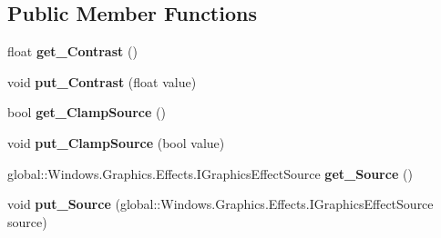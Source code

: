 \subsection*{Public Member Functions}
\begin{DoxyCompactItemize}
\item 
\mbox{\label{interface_microsoft_1_1_graphics_1_1_canvas_1_1_effects_1_1_i_contrast_effect_a10cb9dcb19b37c752c6823630ac1d388}} 
float {\bfseries get\+\_\+\+Contrast} ()
\item 
\mbox{\label{interface_microsoft_1_1_graphics_1_1_canvas_1_1_effects_1_1_i_contrast_effect_ac94c08df24985e960695d86aa7d6a379}} 
void {\bfseries put\+\_\+\+Contrast} (float value)
\item 
\mbox{\label{interface_microsoft_1_1_graphics_1_1_canvas_1_1_effects_1_1_i_contrast_effect_a345ed8973aa3787da9976d5c7cf9031d}} 
bool {\bfseries get\+\_\+\+Clamp\+Source} ()
\item 
\mbox{\label{interface_microsoft_1_1_graphics_1_1_canvas_1_1_effects_1_1_i_contrast_effect_ae649f69d06226e09c126ed7788553c83}} 
void {\bfseries put\+\_\+\+Clamp\+Source} (bool value)
\item 
\mbox{\label{interface_microsoft_1_1_graphics_1_1_canvas_1_1_effects_1_1_i_contrast_effect_a98bcd363ec8c58d3079ab2528b82f5e1}} 
global\+::\+Windows.\+Graphics.\+Effects.\+I\+Graphics\+Effect\+Source {\bfseries get\+\_\+\+Source} ()
\item 
\mbox{\label{interface_microsoft_1_1_graphics_1_1_canvas_1_1_effects_1_1_i_contrast_effect_ac1bd8acb3ffbb5750d0523f240810481}} 
void {\bfseries put\+\_\+\+Source} (global\+::\+Windows.\+Graphics.\+Effects.\+I\+Graphics\+Effect\+Source source)
\item 
\mbox{\label{interface_microsoft_1_1_graphics_1_1_canvas_1_1_effects_1_1_i_contrast_effect_a10cb9dcb19b37c752c6823630ac1d388}} 

\end{DoxyCompactItemize}
